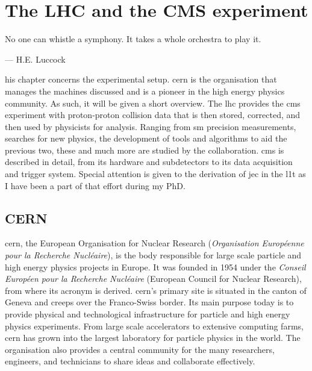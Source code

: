 \chapter{The LHC and the CMS experiment}
\label{chap:detector}

\epigraph{No one can whistle a symphony. It takes a whole orchestra to play it.}{--- H.E. Luccock}

his chapter concerns the experimental setup. \acrshort{cern} is the organisation that manages the machines discussed and is a pioneer in the high energy physics community. As such, it will be given a short overview. The \acrlong{lhc} provides the \acrshort{cms} experiment with proton-proton collision data that is then stored, corrected, and then used by physicists for analysis. Ranging from \acrlong{sm} precision measurements, searches for new physics, the development of tools and algorithms to aid the previous two, these and much more are studied by the collaboration. \acrshort{cms} is described in detail, from its hardware and subdetectors to its data acquisition and trigger system. Special attention is given to the derivation of \acrfull{jec} in the \acrfull{l1t} as I have been a part of that effort during my PhD.




\section{CERN}
\label{sec:detector_cern}

\acrshort{cern}, the European Organisation for Nuclear Research (\emph{Organisation Europ\'{e}enne pour la Recherche Nucl\'{e}aire}), is the body responsible for large scale particle and high energy physics projects in Europe. It was founded in 1954 under the \emph{Conseil Europ\'{e}en pour la Recherche Nucl\'{e}aire} (European Council for Nuclear Research), from where its acronym is derived. \acrshort{cern}'s primary site is situated in the canton of Geneva and creeps over the Franco-Swiss border. Its main purpose today is to provide physical and technological infrastructure for particle and high energy physics experiments. From large scale accelerators to extensive computing farms, \acrshort{cern} has grown into the largest laboratory for particle physics in the world. The organisation also provides a central community for the many researchers, engineers, and technicians to share ideas and collaborate effectively.

